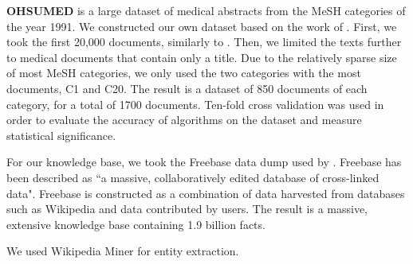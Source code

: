 \documentclass{article}
\theoremstyle{definition}
\begin{document}
\textbf{OHSUMED} \citep{hersh1994ohsumed} is a large dataset of medical abstracts from the MeSH categories of the year 1991. 
We constructed our own dataset based on the work of \citep{joachims1998text}.
First, we took the first 20,000 documents, similarly to \cite{joachims1998text}.
Then, we limited the texts further to medical documents that contain only a title. %
Due to the relatively sparse size of most MeSH categories, we only used the two categories with the most documents, C1 and C20. %
The result is a dataset of 850 documents of each category, for a total of 1700 documents.
Ten-fold cross validation was used in order to evaluate the accuracy of algorithms on the dataset and measure statistical significance.

For our knowledge base, we took the Freebase data dump used by \cite{bast2014easy}. Freebase has been described as ``a massive, collaboratively edited database of cross-linked data". Freebase is constructed as a combination of data harvested from databases such as Wikipedia and data contributed by users. The result is a massive, extensive knowledge base containing 1.9 billion facts. 

We used Wikipedia Miner \citep{milne2013open} for entity extraction. 


\end{document}
